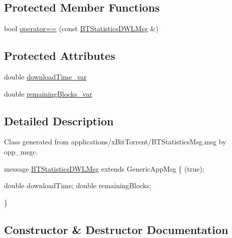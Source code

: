 \subsection*{Protected Member Functions}
\begin{DoxyCompactItemize}
\item 
bool \hyperlink{classBTStatisticsDWLMsg_a47274ebf65ba844b1c6c3fc34135591f}{operator==} (const \hyperlink{classBTStatisticsDWLMsg}{B\+T\+Statistics\+D\+W\+L\+Msg} \&)
\end{DoxyCompactItemize}
\subsection*{Protected Attributes}
\begin{DoxyCompactItemize}
\item 
double \hyperlink{classBTStatisticsDWLMsg_aac2d1b785397639eda222a1ca199c9b9}{download\+Time\+\_\+var}
\item 
double \hyperlink{classBTStatisticsDWLMsg_a75864f08a2c20984746ee75831c0732c}{remaining\+Blocks\+\_\+var}
\end{DoxyCompactItemize}


\subsection{Detailed Description}
Class generated from {\ttfamily applications/x\+Bit\+Torrent/\+B\+T\+Statistics\+Msg.\+msg} by opp\+\_\+msgc. 
\begin{DoxyPre}
message \hyperlink{classBTStatisticsDWLMsg}{BTStatisticsDWLMsg} extends GenericAppMsg
\{
    (true);\end{DoxyPre}



\begin{DoxyPre}    double downloadTime;        
    double remainingBlocks;\end{DoxyPre}



\begin{DoxyPre}\}
\end{DoxyPre}
 

\subsection{Constructor \& Destructor Documentation}
\hypertarget{classBTStatisticsDWLMsg_aaa3666e7e5a800b20de90f2542b983ac}{}
